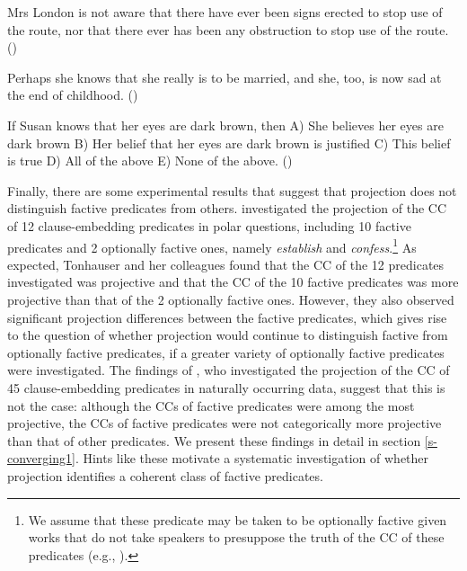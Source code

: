\documentclass[11pt,fleqn]{article}
\newcommand{\6}{\mbox{$[\hspace*{-.6mm}[$}}
\newcommand{\9}{\mbox{$]\hspace*{-.6mm}]$}}
\begin{document}
\begin{exe}
\ex\label{nat2}

\begin{xlist}

\ex Mrs London is not aware that there have ever been signs erected to stop use of the route, nor that there ever has been  any obstruction to stop use of the route. \hfill (\citealt[83]{beaver-belly})

\ex Perhaps she knows that she really is to be married, and she, too, is now sad at the end of childhood. \hfill (\citealt[86]{beaver-belly})

\ex If Susan knows that her eyes are dark brown, then A) She believes her eyes are dark brown B) Her belief that her eyes are dark brown is justified C) This belief is true D) All of the above E) None of the above. \hfill (\citealt[84]{beaver-belly})

\end{xlist}
\end{exe}

Finally, there are some experimental results that suggest that projection does not distinguish factive predicates from others. \citealt{tbd-variability} investigated the projection of the CC of 12 clause-embedding predicates in polar questions, including 10 factive predicates and 2 optionally factive ones, namely {\em establish} and {\em confess}.\footnote{We assume that these predicate may be taken to be optionally factive given works that do not take speakers to presuppose the truth of the CC of these predicates (e.g., \citealt{wyse,swanson2012,karttunen2016}).} As expected, Tonhauser and her colleagues found that the CC of the 12 predicates investigated was projective and that the CC of the 10 factive predicates was more projective than that of the 2 optionally factive ones. However, they also observed significant projection differences between the factive predicates, which gives rise to the question of whether projection would continue to distinguish factive from optionally factive predicates, if a greater variety of optionally factive predicates were investigated. The findings of \citealt{demarneffe-etal-sub23}, who investigated the projection of the CC of 45 clause-embedding predicates in naturally occurring data, suggest that this is not the case: although the CCs of factive predicates were among the most projective, the CCs of factive predicates were not categorically more projective than that of other predicates. We present these findings in detail in section \ref{s-converging1}. Hints like these motivate a systematic investigation of whether projection identifies a coherent class of factive predicates.
\end{document}
